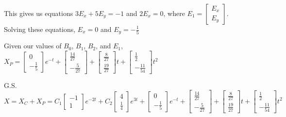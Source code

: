 \documentclass{article}
\begin{document}
\noindent This gives us equations $3E_{x} + 5E_{y} = -1$ and $2E_{x} = 0$, where $E_{1} = \begin{bmatrix}
    E_{x}\\
    E_{y}
\end{bmatrix}$.  Solving these equations, $E_{x} = 0$ and $E_{y} = -\frac{1}{5}$ \par\vspace{0.25cm}

\noindent Given our values of $B_{0}$, $B_{1}$, $B_{2}$, and $E_{1}$, $X_{P} = \begin{bmatrix}
    0\\
    -\frac{1}{5}
\end{bmatrix}e^{-t} + \begin{bmatrix}
    \frac{14}{27}\\
    -\frac{5}{27}
\end{bmatrix} + \begin{bmatrix}
    \frac{8}{27} \\
    \frac{19}{27}
\end{bmatrix}t + \begin{bmatrix}
    \frac{1}{2}\\
    -\frac{11}{54}
\end{bmatrix}t^{2}$ \par\vspace{0.25cm}

\noindent G.S. $X = X_{C} + X_{P} = C_{1}\begin{bmatrix}
    -1\\
    1
\end{bmatrix}e^{-2t} + C_{2}\begin{bmatrix}
    4\\
    \frac{1}{4}
\end{bmatrix}e^{3t} + \begin{bmatrix}
    0\\
    -\frac{1}{5}
\end{bmatrix}e^{-t} + \begin{bmatrix}
    \frac{14}{27}\\
    -\frac{5}{27}
\end{bmatrix} + \begin{bmatrix}
    \frac{8}{27} \\
    \frac{19}{27}
\end{bmatrix}t + \begin{bmatrix}
    \frac{1}{2}\\
    -\frac{11}{54}
\end{bmatrix}t^{2}$
\end{document}
